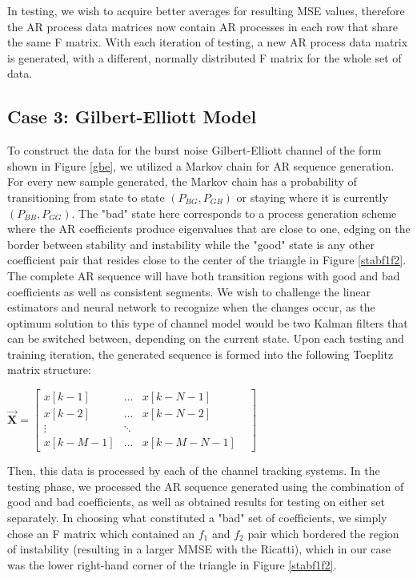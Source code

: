 \documentclass[twocolumn,letterpaper]{IEEEAerospaceCLS}  %
\begin{document}
In testing, we wish to acquire better averages for resulting MSE values, therefore the AR process data matrices now contain AR processes in each row that share the same F matrix. With each iteration of testing, a new AR process data matrix is generated, with a different, normally distributed F matrix for the whole set of data.  

\subsection{Case 3: Gilbert-Elliott Model}

To construct the data for the burst noise Gilbert-Elliott channel of the form shown in Figure \ref{gbe}, we utilized a Markov chain for AR sequence generation. For every new sample generated, the Markov chain has a probability of transitioning from state to state $(P_{BG}, P_{GB})$ or staying where it is currently $(P_{BB}, P_{GG})$. The "bad" state here corresponds to a process generation scheme where the AR coefficients produce eigenvalues that are close to one, edging on the border between stability and instability while the "good" state is any other coefficient pair that resides close to the center of the triangle in Figure \ref{stabf1f2}. The complete AR sequence will have both transition regions with good and bad coefficients as well as consistent segments. We wish to challenge the linear estimators and neural network to recognize when the changes occur, as the optimum solution to this type of channel model would be two Kalman filters that can be switched between, depending on the current state. Upon each testing and training iteration, the generated sequence is formed into the following Toeplitz matrix structure:

$\vec{\textbf{X}} = \begin{bmatrix}
x[k-1]   & ...       & x[k-N-1]     & \\
x[k-2]   & ...       & x[k-N-2]     & \\
\vdots             &  \ddots   &              & \\
x[k-M-1] & ...       & x[k-M-N-1]  
\end{bmatrix}$

Then, this data is processed by each of the channel tracking systems. In the testing phase, we processed the AR sequence generated using the combination of good and bad coefficients, as well as obtained results for testing on either set separately. In choosing what constituted a "bad" set of coefficients, we simply chose an F matrix which contained an $f_1$ and $f_2$ pair which bordered the region of instability (resulting in a larger MMSE with the Ricatti), which in our case was the lower right-hand corner of the triangle in Figure \ref{stabf1f2}. 
\end{document}
